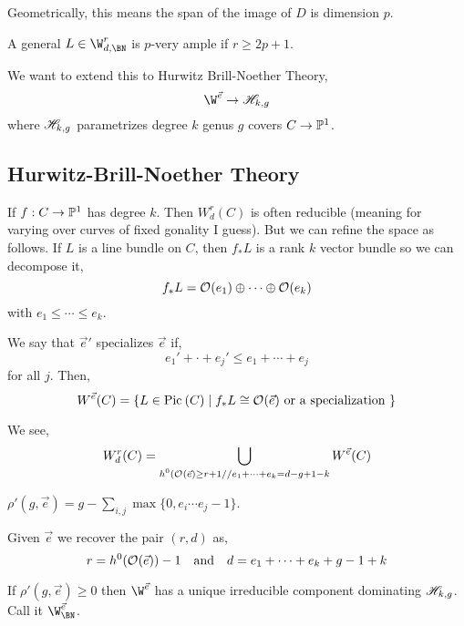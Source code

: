 \documentclass[12pt]{article}
\begin{document}
\begin{rmk}
Geometrically, this means the span of the image of $D$ is dimension $p$.
\end{rmk}

\begin{theorem}[Farkas]
A general $L \in \W^r_{d, \BN}$ is $p$-very ample if $r \ge 2p + 1$.
\end{theorem}

We want to extend this to Hurwitz Brill-Noether Theory,
\[ \W^{\vec{e}} \to \H_{k,g} \]
where $\H_{k,g}$ parametrizes degree $k$ genus $g$ covers $C \to \P^1$. 

\subsection{Hurwitz-Brill-Noether Theory}

If $f : C \to \P^1$ has degree $k$. Then $W^r_d(C)$ is often reducible (meaning for varying over curves of fixed gonality I guess). But we can refine the space as follows. If $L$ is a line bundle on $C$, then $f_* L$ is a rank $k$ vector bundle so we can decompose it,
\[ f_* L = \struct{}(e_1) \oplus \cdots \oplus \struct{}(e_k) \]
with $e_1 \le \cdots \le e_k$. 

\begin{defn}
We say that $\vec{e}'$ specializes $\vec{e}$ if,
\[ e_1' + \cdot + e_j' \le e_1 + \cdots + e_j \]
for all $j$. Then,
\[ W^{\vec{e}}(C) = \{ L \in \Pic{C} \mid f_* L \cong \struct{}(\vec{e}) \text{ or a specialization } \} \]
\end{defn}

\begin{prop}
We see,
\[ W^r_d(C) = \bigcup_{\substack{ h^0(\struct{}(\vec{e}) \ge r + 1 // e_1 + \cdots + e_k = d - g + 1 - k}} W^{\vec{e}}(C) \]
\end{prop}

\begin{defn}
$\rho'(g, \vec{e}) = g - \sum_{i,j} \max \{ 0, e_i \cdots e_j - 1 \}$.
\end{defn}

\begin{rmk}
Given $\vec{e}$ we recover the pair $(r,d)$ as,
\[ r = h^0(\struct{}(\vec{e})) - 1 \quad \text{and} \quad d = e_1 + \cdots + e_k + g - 1 + k \]
\end{rmk}

\begin{theorem}
If $\rho'(g, \vec{e}) \ge 0$ then $\W^{\vec{e}}$ has a unique irreducible component dominating $\H_{k,g}$. Call it $\W^{\vec{e}}_{\BN}$.
\end{theorem}
\end{document}

